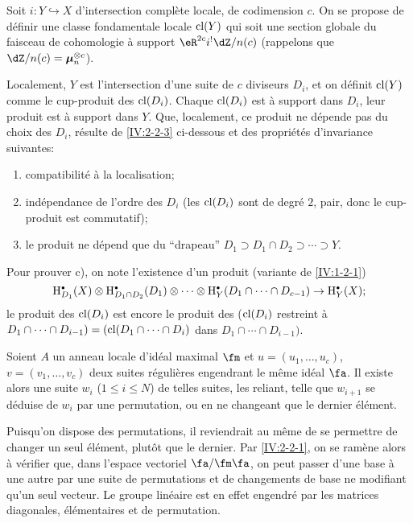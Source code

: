 Soit $i:Y\hookrightarrow X$ d'intersection complète locale, de codimension 
$c$. On se propose de définir une classe fondamentale locale 
$\operatorname{cl}(Y)$ qui soit une section globale du faisceau de cohomologie à support 
$\eR^{2c}i^! \dZ/n(c)$ (rappelons que $\dZ/n(c)=\dmu_n^{\otimes c}$). 

Localement, $Y$ est l'intersection d'une suite de $c$ diviseurs $D_i$, et on 
définit $\operatorname{cl}(Y)$ comme le cup-produit des $\operatorname{cl}(D_i)$. Chaque $\operatorname{cl}(D_i)$ est 
à support dans $D_i$, leur produit est à support dans $Y$. Que, localement, 
ce produit ne dépende pas du choix des $D_i$, résulte de \ref{IV:2-2-3} 
ci-dessous et des propriétés d'invariance suivantes:
\begin{enumerate}[\indent a)]
  \item compatibilité à la localisation;
  \item indépendance de l'ordre des $D_i$ (les $\operatorname{cl}(D_i)$ sont de degré 
    $2$, pair, donc le cup-produit est commutatif);
  \item le produit ne dépend que du ``drapeau'' 
    $D_1\supset D_1\cap D_2\supset \cdots\supset Y$. 
\end{enumerate}
Pour prouver c), on note l'existence d'un produit (variante de \ref{IV:1-2-1}) 
\[
  \h_{D_1}^\bullet(X)\otimes \h_{D_1\cap D_2}^\bullet(D_1)\otimes \cdots \otimes \h_Y^\bullet(D_1\cap \cdots \cap D_{c-1}) \to \h_Y^\bullet(X) \text{;}
\]
le produit des $\operatorname{cl}(D_i)$ est encore le produit des ($\operatorname{cl}(D_i)$ restreint à 
$D_1\cap \cdots \cap D_{i-1})=(\operatorname{cl}(D_1\cap \cdots \cap D_i)$ dans 
$D_1\cap \cdots \cap D_{i-1})$. 





\begin{lemma}\label{IV:2-2-3}
Soient $A$ un anneau locale d'idéal maximal $\fm$ et $u=(u_1,\dots,u_c)$, 
$v=(v_1,\dots,v_c)$ deux suites régulières engendrant le même idéal 
$\fa$. Il existe alors une suite $w_i$ ($1\leqslant i\leqslant N$) de telles 
suites, les reliant, telle que $w_{i+1}$ se déduise de $w_i$ par une 
permutation, ou en ne changeant que le dernier élément.
\end{lemma}

Puisqu'on dispose des permutations, il reviendrait au même de se permettre de 
changer un seul élément, plutôt que le dernier. Par \ref{IV:2-2-1}, on se 
ramène alors à vérifier que, dans l'espace vectoriel $\fa/\fm\fa$, on 
peut passer d'une base à une autre par une suite de permutations et de 
changements de base ne modifiant qu'un seul vecteur. Le groupe linéaire est 
en effet engendré par les matrices diagonales, élémentaires et de 
permutation. 





